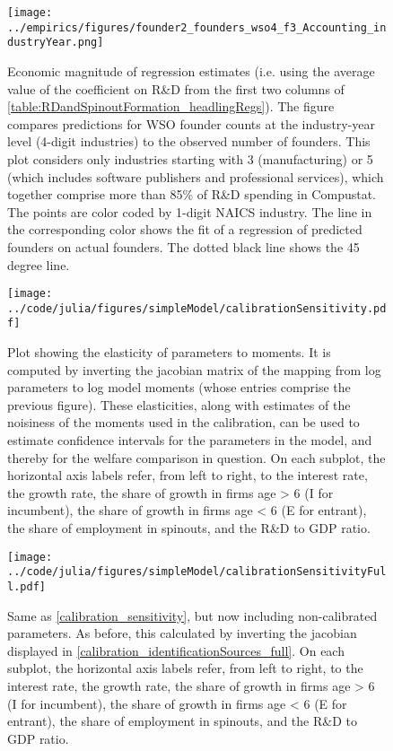 \documentclass[11pt,english]{article}
\theoremstyle{definition}
\begin{document}
\begin{figure}[]
	\centering
	\texttt{[image: ../empirics/figures/founder2\_founders\_wso4\_f3\_Accounting\_industryYear.png]}
	\caption{Economic magnitude of regression estimates (i.e. using the average value of the coefficient on R\&D from the first two columns of \autoref{table:RDandSpinoutFormation_headlingRegs}). The figure compares predictions for WSO founder counts at the industry-year level (4-digit industries) to the observed number of founders. This plot considers only industries starting with 3 (manufacturing) or 5 (which includes software publishers and professional services), which together comprise more than 85\% of R\&D spending in Compustat. The points are color coded by 1-digit NAICS industry. The line in the corresponding color shows the fit of a regression of predicted founders on actual founders. The dotted black line shows the 45 degree line.}
	\label{figure:founder2_founders_f3_Accounting_industryYear}
\end{figure}

\begin{figure}[]
	\centering
	\texttt{[image: ../code/julia/figures/simpleModel/calibrationSensitivity.pdf]}
	\caption{Plot showing the elasticity of parameters to moments. It is computed by inverting the jacobian matrix of the mapping from log parameters to log model moments (whose entries comprise the previous figure). These elasticities, along with estimates of the noisiness of the moments used in the calibration, can be used to estimate confidence intervals for the parameters in the model, and thereby for the welfare comparison in question. On each subplot, the horizontal axis labels refer, from left to right, to the interest rate, the growth rate, the share of growth in firms age > 6 (I for incumbent), the share of growth in firms age < 6 (E for entrant), the share of employment in spinouts, and the R\&D to GDP ratio.}
	\label{calibration_sensitivity}
\end{figure}

\begin{figure}[]
	\centering
	\texttt{[image: ../code/julia/figures/simpleModel/calibrationSensitivityFull.pdf]}
	\caption{Same as \autoref{calibration_sensitivity}, but now including non-calibrated parameters. As before, this calculated by inverting the jacobian displayed in \autoref{calibration_identificationSources_full}. On each subplot, the horizontal axis labels refer, from left to right, to the interest rate, the growth rate, the share of growth in firms age > 6 (I for incumbent), the share of growth in firms age < 6 (E for entrant), the share of employment in spinouts, and the R\&D to GDP ratio.}
	\label{calibration_sensitivity_full}
\end{figure}
\end{document}

